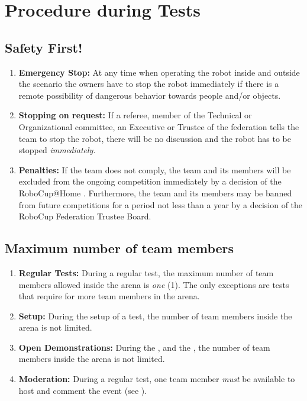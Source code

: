 \section{Procedure during Tests}

\subsection{Safety First!}
\label{rule:safetyfirst}
\begin{enumerate}
	\item \textbf{Emergency Stop:} At any time when operating the robot inside and outside the scenario the owners have to stop the robot immediately if there is a remote possibility of dangerous behavior towards people and/or objects. 
	\item \textbf{Stopping on request:} If a referee, member of the Technical or Organizational committee, an Executive or Trustee of the federation tells the team to stop the robot, there will be no discussion and the robot has to be stopped \emph{immediately}.
	\item \textbf{Penalties:} If the team does not comply, the team and its members will be excluded from the ongoing competition immediately by a decision of the RoboCup@Home . 	Furthermore, the team and its members may be banned from future competitions for a period not less than a year by a decision of the RoboCup Federation Trustee Board.
\end{enumerate}

\subsection{Maximum number of team members}
\label{rule:number_of_people}
\begin{enumerate}
	\item \textbf{Regular Tests:} During a regular test, the maximum number of team members allowed inside the arena is \emph{one} (1). The only exceptions are tests that require for more team members in the arena.
	\item \textbf{Setup:} During the setup of a test, the number of team members inside the arena is not limited.
	\item \textbf{Open Demonstrations:} During the , and the , the number of team members inside the arena is not limited. 
	\item \textbf{Moderation:} During a regular test, one team member \emph{must} be available to host and comment the event (see ).
\end{enumerate}

